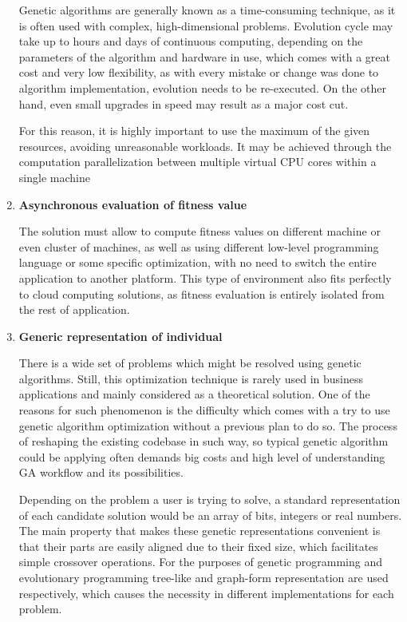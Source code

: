\begin{enumerate}
Genetic algorithms are generally known as a time-consuming technique, as it is often used with complex, high-dimensional problems. Evolution cycle may take up to hours and days of continuous computing, depending on the parameters of the algorithm and hardware in use, which comes with a great cost and very low flexibility, as with every mistake or change was done to algorithm implementation, evolution needs to be re-executed. On the other hand, even small upgrades in speed may result as a major cost cut.

For this reason, it is highly important to use the maximum of the given resources, avoiding unreasonable workloads. It may be achieved through the computation parallelization between multiple virtual CPU cores within a single machine
\medbreak

\item \textbf{Asynchronous evaluation of fitness value}

The solution must allow to compute fitness values on different machine or even cluster of machines, as well as using different low-level programming language or some specific optimization, with no need to switch the entire application to another platform. This type of environment also fits perfectly to cloud computing solutions, as fitness evaluation is entirely isolated from the rest of application.
\medbreak

\item \textbf{Generic representation of individual}

There is a wide set of problems which might be resolved using genetic algorithms. Still, this optimization technique is rarely used in business applications and mainly considered as a theoretical solution. One of the reasons for such phenomenon is the difficulty which comes with a try to use genetic algorithm optimization without a previous plan to do so. The process of reshaping the existing codebase in such way, so typical genetic algorithm could be applying often demands big costs and high level of understanding GA workflow and its possibilities.

Depending on the problem a user is trying to solve, a standard representation of each candidate solution would be an array of bits, integers or real numbers. The main property that makes these genetic representations convenient is that their parts are easily aligned due to their fixed size, which facilitates simple crossover operations. For the purposes of genetic programming and evolutionary programming tree-like and graph-form representation are used respectively, which causes the necessity in different implementations for each problem.


\end{enumerate}
